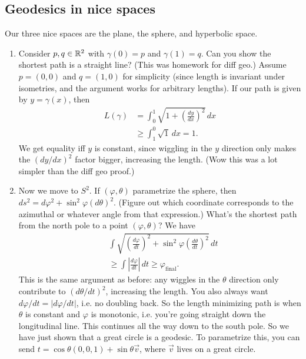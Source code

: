 \subsection{Geodesics in nice spaces}
Our three nice spaces are the plane, the sphere, and hyperbolic space.
\begin{enumerate}[label=(\arabic*)]
    \item Consider $p,q \in \mathbb{R}^2$ with $\gamma (0)=p$ and $\gamma (1)=q$. Can you show the shortest path is a straight line? (This was homework for diff geo.) Assume $p=(0,0)$ and $q=(1,0)$ for simplicity (since length is invariant under isometries, and the argument works for arbitrary lengths). If our path is given by $y=\gamma (x)$, then 
        \begin{align*}
            L(\gamma )&=\int_{0}^{1} \sqrt{1+\left( \frac{dy}{dx} \right)^2 }  \, dx\\
                      &\geq \int_{1}^{0} \sqrt{1}  \, dx=1.
        \end{align*}We get equality iff $y$ is constant, since wiggling in the $y$ direction only makes the $(dy /dx )^2$ factor bigger, increasing the length. (Wow this was a lot simpler than the diff geo proof.)
    \item Now we move to $S^2$. If $(\varphi ,\theta)$ parametrize the sphere, then $ds ^2= d \varphi ^2+ \sin ^2 \varphi (d \theta)^2$. (Figure out which coordinate corresponds to the azimuthal or whatever angle from that expression.) What's the shortest path from the north pole to a point $(\varphi ,\theta)$? We have 
        \begin{align*}
            &\int \sqrt{\left( \frac{d\varphi }{dt} \right) ^2+ \sin ^2 \varphi \left( \frac{d \theta}{dt} \right) ^2}  \, dt\\
            &\geq \int \left| \frac{d\varphi }{dt} \right|  \, dt\geq \varphi _{\text{final} }.
        \end{align*}This is the same argument as before: any wiggles in the $\theta$ direction only contribute to $(d \theta / dt)^2$, increasing the length. You also always want $d \varphi /dt=| d\varphi /dt|$, i.e. no doubling back. So the length minimizing path is when $\theta$ is constant and $\varphi $ is monotonic, i.e. you're going straight down the longitudinal line. This continues all the way down to the south pole. So we have just shown that a great circle is a geodesic. To parametrize this, you can send $t=\cos \theta(0,0,1)+\sin \theta\vec v$, where $\vec v$ lives on a great circle. 


\end{enumerate}
